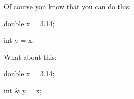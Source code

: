 Of course you know that you can do this:



\begin{consolethree}[escapeinside=||]

double x = 3.14;

int y = x;

\end{consolethree}



What about this:



\begin{consolethree}[escapeinside=||]

double x = 3.14;

int & y = x;

\end{consolethree}

